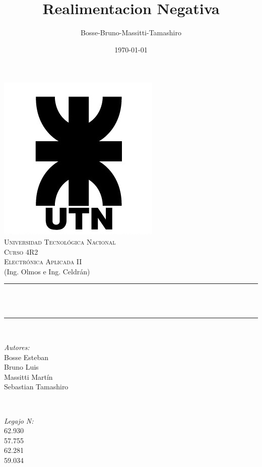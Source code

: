 \documentclass[12pt]{article}
\title{Realimentacion Negativa}								%
\author{Bosse-Bruno-Massitti-Tamashiro}								%
\date{\today}											%
\makeatletter
\let\thetitle\@title
\let\thedate\@date
\makeatother
\begin{document}

\begin{titlepage}
	\centering
    \vspace*{0.5 cm}
    \includegraphics[scale = 0.45]{utn_logo.jpg}\\[1.0 cm]	%
    \textsc{\LARGE Universidad Tecnológica Nacional}\\[2.0 cm]	%
	\textsc{\Large Curso 4R2}\\[0.5 cm]				%
	\textsc{\large Electrónica Aplicada II}\\[0 cm]				%
	\textrm{\large (Ing. Olmos e Ing. Celdrán)}\\[0.5 cm]
    \rule{\linewidth}{0.2 mm} \\[0.4 cm]
	{ \huge \bfseries \thetitle}\\
	\rule{\linewidth}{0.2 mm} \\[1 cm]
	
	\begin{minipage}{0.4\textwidth}
		\begin{flushleft} \large
			\emph{Autores:}\\
			Bosse Esteban\\Bruno Luis\\Massitti Martín\\Sebastian Tamashiro
			\end{flushleft}
			\end{minipage}~
			\begin{minipage}{0.4\textwidth}
			\begin{flushright} \large
			\emph{Legajo N:} \\
			 62.930\\57.755\\62.281\\59.034									%
		\end{flushright}
	\end{minipage}\\[2 cm]
	
	{\large \thedate}\\[2 cm]
 
	\vfill
	
\end{titlepage}
\end{document}
